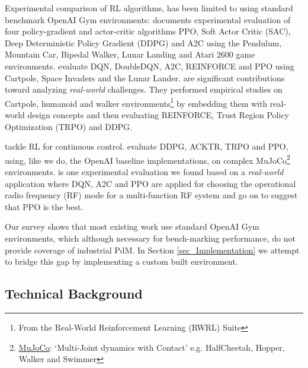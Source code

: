 \documentclass[referee, sn-mathphys-num]{sn-jnl}
\begin{document}
	Experimental comparison of RL algorithms, has been limited to using standard benchmark OpenAI Gym environments: \cite{sandeep2022experimental} documents experimental evaluation of four policy-gradient and actor-critic algorithms PPO, Soft Actor Critic (SAC), Deep Deterministic Policy Gradient (DDPG) and A2C using the Pendulum, Mountain Car, Bipedal Walker, Lunar Landing and Atari 2600 game environments. \cite{Krishna2020} evaluate DQN, DoubleDQN, A2C, REINFORCE and PPO using Cartpole, Space Invaders and the Lunar Lander. \cite{dulac2021, dulac2020empirical} are significant contributions toward analyzing \textit{real-world} challenges. They performed empirical studies on Cartpole, humanoid and walker environments\footnote{From the Real-World Reinforcement Learning (RWRL) Suite} by embedding them with real-world design concepts and then evaluating REINFORCE, Trust Region Policy Optimization (TRPO) and DDPG. %
	
	\cite{dulac2021, henderson2018deep} tackle RL for continuous control. \cite{henderson2018deep} evaluate DDPG, ACKTR, TRPO and PPO, using, like we do, the OpenAI baseline implementations, on complex MuJoCo\footnote{\href{https://mujoco.org/}{MuJoCo}: `Multi-Joint dynamics with Contact' e.g. HalfCheetah, Hopper, Walker and Swimmer} environments. \cite{ford2022cognitive} is one experimental evaluation we found based on a \textit{real-world} application where DQN, A2C and PPO are applied for choosing the operational radio frequency (RF) mode for a multi-function RF system and go on to suggest that PPO is the best.
	
	Our survey shows that most existing work use standard OpenAI Gym environments, which although necessary for bench-marking performance, do not provide coverage of industrial PdM. In Section {\ref{sec_Implementation}} we attempt to bridge this gap by implementing a custom built environment.
	
	\subsection{Technical Background}
\end{document}
